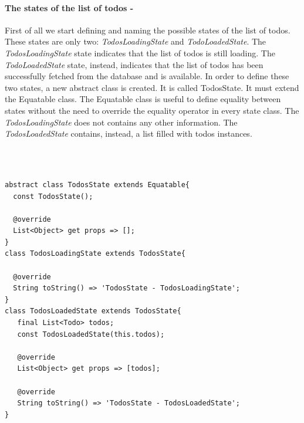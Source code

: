 \paragraph{The states of the list of todos - }
\label{subpar:todo_app_bloc_core_state}
First of all we start defining and naming the possible states of the list of todos. These states are only two: \textit{TodosLoadingState} and \textit{TodoLoadedState}. The \textit{TodosLoadingState} state indicates that the list of todos is still loading. The \textit{TodoLoadedState} state, instead, indicates that the list of todos has been successfully fetched from the database and is available. In order to define these two states, a new abstract class is created. It is called TodosState. It must extend the Equatable class. The  Equatable class is useful to define equality between states without the need to override the equality operator in every state class. The \textit{TodosLoadingState} does not contains any other information. The \textit{TodosLoadedState} contains, instead, a list filled with todos instances.
\begin{code}
\mbox{}\\
 \mbox{}
\label{code:2.14}
\begin{verbatim}

abstract class TodosState extends Equatable{
  const TodosState();
  
  @override
  List<Object> get props => [];
}
class TodosLoadingState extends TodosState{

  @override
  String toString() => 'TodosState - TodosLoadingState';
}
class TodosLoadedState extends TodosState{
   final List<Todo> todos;
   const TodosLoadedState(this.todos);
   
   @override
   List<Object> get props => [todos];
   
   @override
   String toString() => 'TodosState - TodosLoadedState';
} 
\end{verbatim}
\mbox{}
\end{code}


